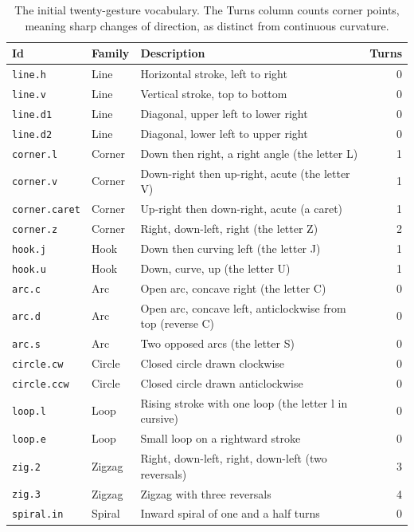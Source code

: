 \begin{table}[t]
\centering
\small
\begin{tabularx}{\textwidth}{@{}llXr@{}}
\toprule
Id & Family & Description & Turns \\
\midrule
\texttt{line.h} & Line & Horizontal stroke, left to right & 0 \\
\texttt{line.v} & Line & Vertical stroke, top to bottom & 0 \\
\texttt{line.d1} & Line & Diagonal, upper left to lower right & 0 \\
\texttt{line.d2} & Line & Diagonal, lower left to upper right & 0 \\
\texttt{corner.l} & Corner & Down then right, a right angle (the letter L) & 1 \\
\texttt{corner.v} & Corner & Down-right then up-right, acute (the letter V) & 1 \\
\texttt{corner.caret} & Corner & Up-right then down-right, acute (a caret) & 1 \\
\texttt{corner.z} & Corner & Right, down-left, right (the letter Z) & 2 \\
\texttt{hook.j} & Hook & Down then curving left (the letter J) & 1 \\
\texttt{hook.u} & Hook & Down, curve, up (the letter U) & 1 \\
\texttt{arc.c} & Arc & Open arc, concave right (the letter C) & 0 \\
\texttt{arc.d} & Arc & Open arc, concave left, anticlockwise from top (reverse C) & 0 \\
\texttt{arc.s} & Arc & Two opposed arcs (the letter S) & 0 \\
\texttt{circle.cw} & Circle & Closed circle drawn clockwise & 0 \\
\texttt{circle.ccw} & Circle & Closed circle drawn anticlockwise & 0 \\
\texttt{loop.l} & Loop & Rising stroke with one loop (the letter l in cursive) & 0 \\
\texttt{loop.e} & Loop & Small loop on a rightward stroke & 0 \\
\texttt{zig.2} & Zigzag & Right, down-left, right, down-left (two reversals) & 3 \\
\texttt{zig.3} & Zigzag & Zigzag with three reversals & 4 \\
\texttt{spiral.in} & Spiral & Inward spiral of one and a half turns & 0 \\
\bottomrule
\end{tabularx}
\caption{The initial twenty-gesture vocabulary. The Turns column counts corner points, meaning sharp changes of direction, as distinct from continuous curvature.}
\label{tab:vocabulary}
\end{table}

